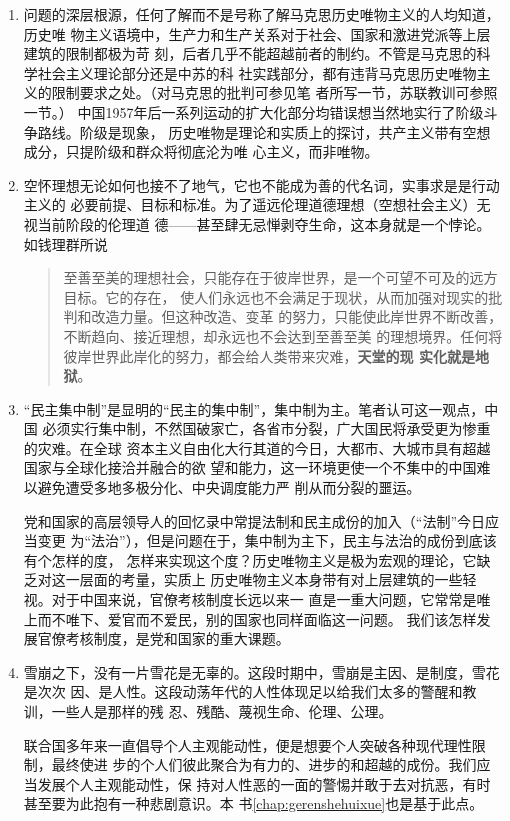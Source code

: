\begin{enumerate}
\item 问题的深层根源，任何了解而不是号称了解马克思历史唯物主义的人均知道，历史唯
  物主义语境中，生产力和生产关系对于社会、国家和激进党派等上层建筑的限制都极为苛
  刻，后者几乎不能超越前者的制约。不管是马克思的科学社会主义理论部分还是中苏的科
  社实践部分，都有违背马克思历史唯物主义的限制要求之处。（对马克思的批判可参见笔
  者所写一节，苏联教训可参照一节。）
  中国1957年后一系列运动的扩大化部分均错误想当然地实行了阶级斗争路线。阶级是现象，
  历史唯物是理论和实质上的探讨，共产主义带有空想成分，只提阶级和群众将彻底沦为唯
  心主义，而非唯物。

\item 空怀理想无论如何也接不了地气，它也不能成为善的代名词，实事求是是行动主义的
  必要前提、目标和标准。为了遥远伦理道德理想（空想社会主义）无视当前阶段的伦理道
  德——甚至肆无忌惮剥夺生命，这本身就是一个悖论。如钱理群所说
  \begin{quotation}
    至善至美的理想社会，只能存在于彼岸世界，是一个可望不可及的远方目标。它的存在，
    使人们永远也不会满足于现状，从而加强对现实的批判和改造力量。但这种改造、变革
    的努力，只能使此岸世界不断改善，不断趋向、接近理想，却永远也不会达到至善至美
    的理想境界。任何将彼岸世界此岸化的努力，都会给人类带来灾难，\textbf{天堂的现
      实化就是地狱}。
  \end{quotation}

\item “民主集中制”是显明的“民主的集中制”，集中制为主。笔者认可这一观点，中国
  必须实行集中制，不然国破家亡，各省市分裂，广大国民将承受更为惨重的灾难。在全球
  资本主义自由化大行其道的今日，大都市、大城市具有超越国家与全球化接洽并融合的欲
  望和能力，这一环境更使一个不集中的中国难以避免遭受多地多极分化、中央调度能力严
  削从而分裂的噩运。

  党和国家的高层领导人的回忆录中常提法制和民主成份的加入（“法制”今日应当变更
  为“法治”），但是问题在于，集中制为主下，民主与法治的成份到底该有个怎样的度，
  怎样来实现这个度？历史唯物主义是极为宏观的理论，它缺乏对这一层面的考量，实质上
  历史唯物主义本身带有对上层建筑的一些轻视。对于中国来说，官僚考核制度长远以来一
  直是一重大问题，它常常是唯上而不唯下、爱官而不爱民，别的国家也同样面临这一问题。
  我们该怎样发展官僚考核制度，是党和国家的重大课题。

\item 雪崩之下，没有一片雪花是无辜的。这段时期中，雪崩是主因、是制度，雪花是次次
  因、是人性。这段动荡年代的人性体现足以给我们太多的警醒和教训，一些人是那样的残
  忍、残酷、蔑视生命、伦理、公理。

  联合国多年来一直倡导个人主观能动性，便是想要个人突破各种现代理性限制，最终使进
  步的个人们彼此聚合为有力的、进步的和超越的成份。我们应当发展个人主观能动性，保
  持对人性恶的一面的警惕并敢于去对抗恶，有时甚至要为此抱有一种悲剧意识。本
  书\cref{chap:gerenshehuixue}也是基于此点。
\end{enumerate}

